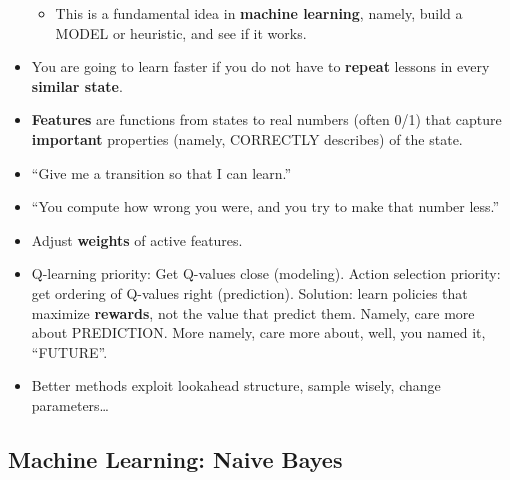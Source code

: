 \documentclass[twocolumn]{article}
\begin{document}
\begin{itemize}
\begin{itemize}
  \item This is a fundamental idea in \textbf{machine learning},
    namely, build a MODEL or heuristic, and see if it works.
  \end{itemize}
\item You are going to learn faster if you do not have to
  \textbf{repeat} lessons in every \textbf{similar state}.
\item \textbf{Features} are functions from states to real numbers
  (often 0/1) that capture \textbf{important} properties (namely,
  CORRECTLY describes) of the state.
\item ``Give me a transition so that I can learn.''
\item ``You compute how wrong you were, and you try to make that
  number less.''
\item Adjust \textbf{weights} of active features.
\item Q-learning priority: Get Q-values close (modeling). Action
  selection priority: get ordering of Q-values right
  (prediction). Solution: learn policies that maximize
  \textbf{rewards}, not the value that predict them. Namely, care more
  about PREDICTION. More namely, care more about, well, you named it,
  ``FUTURE''.
\item Better methods exploit lookahead structure, sample wisely,
  change parameters\ldots
\end{itemize}

\subsection{Machine Learning: Naive Bayes}
\label{sec:mach-learn-naive-1}
\end{document}
